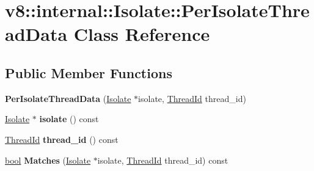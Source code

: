 \hypertarget{classv8_1_1internal_1_1Isolate_1_1PerIsolateThreadData}{}\section{v8\+:\+:internal\+:\+:Isolate\+:\+:Per\+Isolate\+Thread\+Data Class Reference}
\label{classv8_1_1internal_1_1Isolate_1_1PerIsolateThreadData}
\subsection*{Public Member Functions}
\begin{DoxyCompactItemize}
\item 
\mbox{\label{classv8_1_1internal_1_1Isolate_1_1PerIsolateThreadData_ac7375d147bcf918363e02932ab036b98}} 
{\bfseries Per\+Isolate\+Thread\+Data} (\mbox{\hyperlink{classv8_1_1internal_1_1Isolate}{Isolate}} $\ast$isolate, \mbox{\hyperlink{classv8_1_1internal_1_1ThreadId}{Thread\+Id}} thread\+\_\+id)
\item 
\mbox{\label{classv8_1_1internal_1_1Isolate_1_1PerIsolateThreadData_abc657f41133d5299dcb23fc6ef163fb3}} 
\mbox{\hyperlink{classv8_1_1internal_1_1Isolate}{Isolate}} $\ast$ {\bfseries isolate} () const
\item 
\mbox{\label{classv8_1_1internal_1_1Isolate_1_1PerIsolateThreadData_a4777d2851ddb394cb173ba8aca3c7269}} 
\mbox{\hyperlink{classv8_1_1internal_1_1ThreadId}{Thread\+Id}} {\bfseries thread\+\_\+id} () const
\item 
\mbox{\label{classv8_1_1internal_1_1Isolate_1_1PerIsolateThreadData_aefb941453e55625c3f47e425f1a3f04e}} 
\mbox{\hyperlink{classbool}{bool}} {\bfseries Matches} (\mbox{\hyperlink{classv8_1_1internal_1_1Isolate}{Isolate}} $\ast$isolate, \mbox{\hyperlink{classv8_1_1internal_1_1ThreadId}{Thread\+Id}} thread\+\_\+id) const
\end{DoxyCompactItemize}
